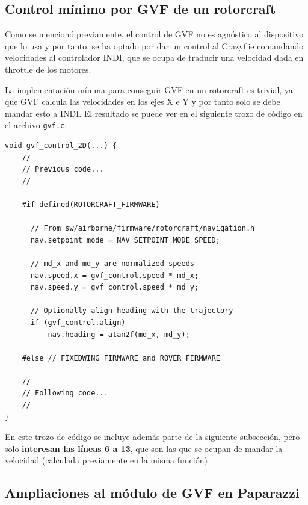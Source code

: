 \subsection{Control mínimo por GVF de un rotorcraft}

Como se mencionó previamente, el control de GVF no es agnóstico al dispositivo que lo usa y por tanto,
se ha optado por dar un control al Crazyflie comandando velocidades al controlador INDI,
que se ocupa de traducir una velocidad dada en throttle de los motores.

La implementación mínima para conseguir GVF en un rotorcraft es trivial, 
ya que GVF calcula las velocidades en los ejes X e Y y por tanto solo se debe mandar esto a INDI.
El resultado se puede ver en el siguiente trozo de código en el archivo \texttt{gvf.c}:

\begin{lstlisting}[style=CodigoC]
void gvf_control_2D(...) {
    //
    // Previous code...
    //
    
    #if defined(ROTORCRAFT_FIRMWARE)
    
      // From sw/airborne/firmware/rotorcraft/navigation.h
      nav.setpoint_mode = NAV_SETPOINT_MODE_SPEED;
      
      // md_x and md_y are normalized speeds
      nav.speed.x = gvf_control.speed * md_x;
      nav.speed.y = gvf_control.speed * md_y;
      
      // Optionally align heading with the trajectory
      if (gvf_control.align) 
          nav.heading = atan2f(md_x, md_y);
          
    #else // FIXEDWING_FIRMWARE and ROVER_FIRMWARE
    
    //
    // Following code...
    //
}
\end{lstlisting}

En este trozo de código se incluye además parte de la siguiente subsección,
pero solo \textbf{interesan las líneas 6 a 13}, que son las que se ocupan de mandar la velocidad
(calculada previamente en la misma función) 


\subsection{Ampliaciones al módulo de GVF en Paparazzi}

